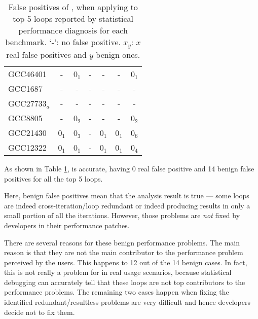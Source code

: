 \begin{table}
\begin{tabular}{lcccccc}
   \midrule
   GCC46401              &   -                  & 0$_1$                       & -                       & -                     &   -             & 0$_1$\\
   GCC1687               &   -                  & -                           & -                       & -                     &   -             & -\\
   GCC27733$_a$          &   -                  & -                           & -                       & -                     &   -             & - \\
   GCC8805               &   -                  & 0$_2$                       & -                       & -                     &   -             & 0$_2$\\
   GCC21430              &   0$_1$              & 0$_3$                       & -                       & 0$_1$                 &   0$_1$         & 0$_6$\\
   GCC12322              &   0$_1$              & 0$_1$                       & -                       & 0$_1$                 &   0$_1$         & 0$_4$\\
\bottomrule
   \end{tabular}
  \caption{False positives of \Tool, when applying to top 5 loops reported by 
    statistical performance diagnosis for each benchmark. `-': no false positive. $x_y$: $x$ real false positives and $y$ benign ones.
}
  \label{tab:top5}
\end{table}

As shown in Table \ref{tab:top5}, \Tool is accurate, having 0 real
false positive and 14 benign false positives for all the top 5 loops.

Here, benign false positives mean that the \Tool analysis result is true ---
some loops are indeed cross-iteration/loop redundant or indeed producing
results in only a small portion of all the iterations. However, those
problems are \textit{not} fixed by developers in their performance patches. 

There are several reasons for these benign performance problems. 
The main reason is that they are not the main contributor to the 
performance problem perceived by the users. This happens to 12 out of the
14 benign cases. In fact, this is not really a problem for \Tool in 
real usage scenarios, because statistical debugging can accurately
tell that these loops are not top contributors to the performance
problems.
The remaining two cases happen when fixing the 
identified redundant/resultless problems
are very difficult and hence developers decide not to fix them.

